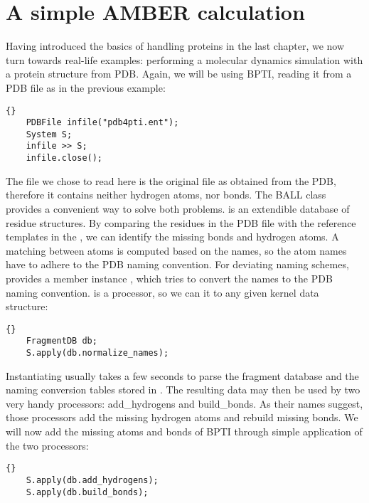 \section{A simple AMBER calculation}


Having introduced the basics of handling proteins in the last chapter, we now
turn towards real-life examples: performing a molecular dynamics simulation
with a protein structure from PDB. Again, we will be using BPTI, reading it
from a PDB file as in the previous example:

\begin{lstlisting}{}
	PDBFile	infile("pdb4pti.ent");
	System S;
	infile >> S;
	infile.close();
\end{lstlisting}

\noindent
The file we chose to read here is the original file as obtained from
the PDB, therefore it contains neither hydrogen atoms, nor bonds.
The BALL class  provides a convenient way to solve
both problems.  is an extendible database of residue
structures. By comparing the residues in the PDB file with the reference
templates in the , we can identify the missing bonds
and hydrogen atoms. A matching between atoms is computed based on the names,
so the atom names have to adhere to the PDB naming convention.
For deviating naming schemes,  provides a member instance
, which tries to convert the names to the PDB 
naming convention.  is a processor, so we
can  it to any given kernel data structure:

\begin{lstlisting}{}
	FragmentDB db;
	S.apply(db.normalize_names);
\end{lstlisting}

\noindent
Instantiating  usually takes a few seconds to parse the
fragment database and the naming conversion tables stored in
. The resulting data may then be used by two
very handy processors: add\_hydrogens and build\_bonds.
As their names suggest, those processors add the missing hydrogen atoms and
rebuild missing bonds. We will now add the missing atoms and bonds of BPTI 
through simple application of the two processors:

\begin{lstlisting}{}
	S.apply(db.add_hydrogens);
	S.apply(db.build_bonds);
\end{lstlisting}

